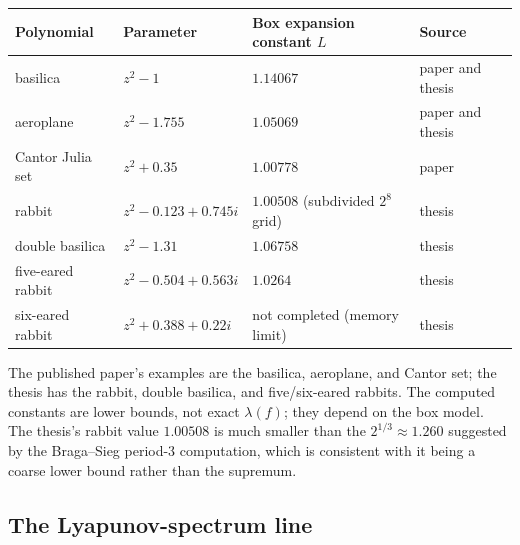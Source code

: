 \documentclass[
]{article}
\newcounter{none} %
\begin{document}
{\def\LTcaptype{none} %
\begin{longtable}[]{@{}
  >{\raggedright\arraybackslash}p{}
  >{\raggedright\arraybackslash}p{}
  >{\raggedright\arraybackslash}p{}
  >{\raggedright\arraybackslash}p{}@{}}
\toprule\noalign{}
\begin{minipage}[b]{\linewidth}\raggedright
Polynomial
\end{minipage} & \begin{minipage}[b]{\linewidth}\raggedright
Parameter
\end{minipage} & \begin{minipage}[b]{\linewidth}\raggedright
Box expansion constant \(L\)
\end{minipage} & \begin{minipage}[b]{\linewidth}\raggedright
Source
\end{minipage} \\
\midrule\noalign{}
\endhead
\bottomrule\noalign{}
\endlastfoot
basilica & \(z^2-1\) & \(1.14067\) & paper and thesis \\
aeroplane & \(z^2-1.755\) & \(1.05069\) & paper and thesis \\
Cantor Julia set & \(z^2+0.35\) & \(1.00778\) & paper \\
rabbit & \(z^2-0.123+0.745i\) & \(1.00508\) (subdivided \(2^8\) grid) &
thesis \\
double basilica & \(z^2-1.31\) & \(1.06758\) & thesis \\
five-eared rabbit & \(z^2-0.504+0.563i\) & \(1.0264\) & thesis \\
six-eared rabbit & \(z^2+0.388+0.22i\) & not completed (memory limit) &
thesis \\
\end{longtable}
}

The published paper's examples are the basilica, aeroplane, and Cantor
set; the thesis has the rabbit, double basilica, and five/six-eared
rabbits. The computed constants are lower bounds, not exact
\(\lambda(f)\); they depend on the box model. The thesis's rabbit value
\(1.00508\) is much smaller than the \(2^{1/3}\approx1.260\) suggested
by the Braga--Sieg period-3 computation, which is consistent with it
being a coarse lower bound rather than the supremum.

\subsection{The Lyapunov-spectrum
line}\label{the-lyapunov-spectrum-line}
\end{document}
